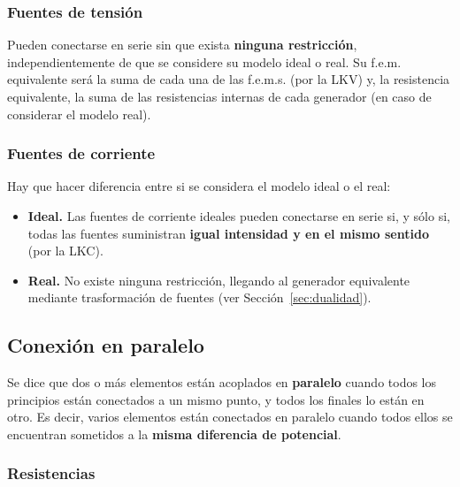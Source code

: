         \subsubsection{Fuentes de tensión}
		
        Pueden conectarse en serie sin que exista \textbf{ninguna
          restricción}, independientemente de que se considere su
        modelo ideal o real. Su f.e.m. equivalente será la suma de
        cada una de las f.e.m.s. (por la LKV) y, la resistencia
        equivalente, la suma de las resistencias internas de cada
        generador (en caso de considerar el modelo real).
		
        \subsubsection{Fuentes de corriente}
		
        Hay que hacer diferencia entre si se considera el modelo ideal
        o el real:
        \begin{itemize}
        \item \textbf{Ideal.} Las fuentes de corriente ideales pueden
          conectarse en serie si, y sólo si, todas las fuentes
          suministran \textbf{igual intensidad y en el mismo sentido}
          (por la LKC).
        \item \textbf{Real.} No existe ninguna restricción, llegando
          al generador equivalente mediante trasformación de fuentes
          (ver Sección~\ref{sec:dualidad}).
        \end{itemize}
	
	\subsection{Conexión en paralelo}
	Se dice que dos o más elementos están acoplados en
        \textbf{paralelo} cuando todos los principios están conectados
        a un mismo punto, y todos los finales lo están en otro. Es
        decir, varios elementos están conectados en paralelo cuando
        todos ellos se encuentran sometidos a la \textbf{misma
          diferencia de potencial}.
	
        \subsubsection{Resistencias}
			
